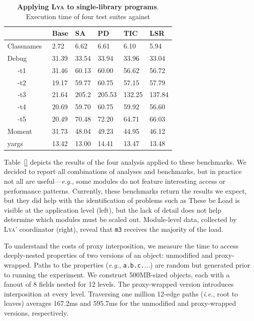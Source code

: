\documentclass[letterpaper,twocolumn,10pt]{article}
\def\eg{{\em e.g.}, }
\def\ie{{\em i.e.}, }
\newcommand{\ttt}[1]{\texttt{#1}}
\newcommand{\sys}{{\scshape Lya}\xspace}
\newcommand{\fixme}[1]{{\color{red}#1}}
\begin{document}
\begin{table}[t]
\center
\footnotesize
\setlength\tabcolsep{3pt}
\caption{
  \footnotesize{
    \textbf{Applying \sys to single-library programs}.
		\fixme{Execution time of four test suites against }
  }
}
\begin{tabular*}{\columnwidth}{l @{\extracolsep{\fill}} ll lll}
\toprule
                    & Base   &  SA   & PD     &   TIC   & LSR     \\
\midrule
Classnames~\cite{}  &  2.72  & 6.62  &  6.61  &  6.10   & 5.94    \\
Debug~\cite{}       & 31.39  & 33.54 &  33.94 &  33.96  & 33.04   \\
~~~-t1              & 31.46  & 60.13 &  60.00 &  56.62  & 56.72   \\
~~~-t2              & 19.17  & 59.77 &  60.75 &  57.15  & 57.79   \\
~~~-t3              & 21.64  & 205.2 &  205.53&  132.25 & 137.84  \\
~~~-t4              & 20.69  & 59.70 &  60.75 &  59.92  & 56.60   \\
~~~-t5              & 20.49  & 70.48 &  72.20 &  64.71  & 66.03   \\
Moment~\cite{}      & 31.73  & 48.04 &  49.23 &  44.95  & 46.12   \\
yargs~\cite{}       & 13.42  & 13.00 &  14.41 &  13.47  & 13.48   \\
\bottomrule
\end{tabular*}
\label{tab:meso}
\vspace{-5mm}
\end{table}


Table~\ref{} depicts the results of the four analysis applied to these benchmarks.
We decided to report all combinations of analyses and benchmarks, but in practice not all are useful---\eg some modules do not feature interesting access or performance patterns.
Currently, these benchmarks return the results we expect, but they did help with the identification of problems such as 
These be
Load is visible at the application level (left), but the lack of detail does not help determine which modules must be scaled out.
Module-level data, collected by \sys' coordinator (right), reveal that \ttt{m3} receives the majority of the load.

To understand the costs of proxy interposition, we measure the time to access deeply-nested properties of two versions of an object:
  unmodified and proxy-wrapped.
Paths to the properties (\eg \ttt{a.b.c.$\ldots$}) are random but generated prior to running the experiment.
We construct 500MB-sized objects, each with a fanout of 8 fields nested for 12 levels.
The proxy-wrapped version introduces interposition at every level.
Traversing one million 12-edge paths (\ie root to leaves) averages 167.2ms and 595.7ms for the unmodified and proxy-wrapped versions, respectively.
\end{document}
